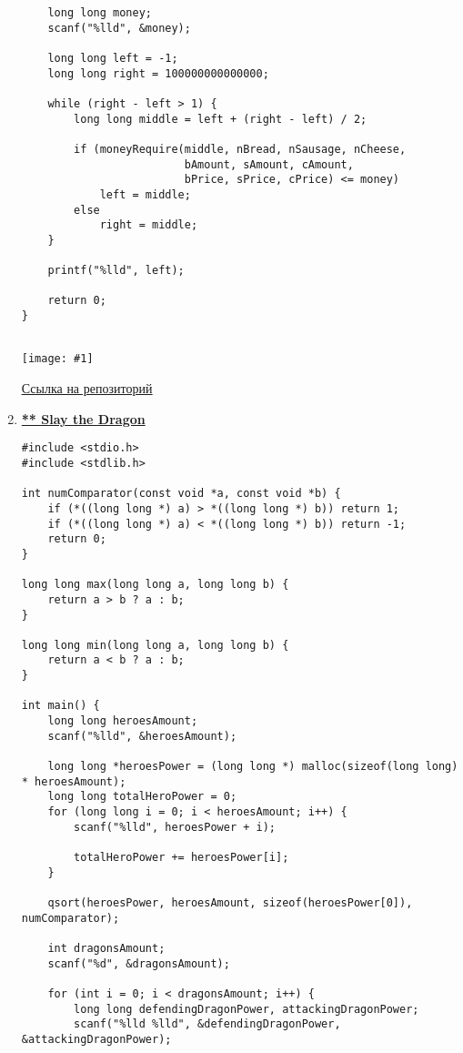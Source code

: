 \documentclass[a4paper,14pt]{extarticle}
\newcommand\codeforcesresult[1]{
    \begin{center}
        \texttt{[image: \#1]}
    \end{center}
}
\begin{document}
\begin{enumerate}
\begin{verbatim}
    long long money;
    scanf("%lld", &money);

    long long left = -1;
    long long right = 100000000000000;

    while (right - left > 1) {
        long long middle = left + (right - left) / 2;

        if (moneyRequire(middle, nBread, nSausage, nCheese,
                         bAmount, sAmount, cAmount,
                         bPrice, sPrice, cPrice) <= money)
            left = middle;
        else
            right = middle;
    }

    printf("%lld", left);

    return 0;
}


\end{verbatim}
\codeforcesresult{/codeforceresults/283932H}
\href{https://github.com/IAmProgrammist/programming-and-algorithmization-basics/blob/c/lab10/17.c}{\underline{Ссылка на репозиторий}}

\newpage
\item \href{https://codeforces.com/problemset/problem/1574/C}{\textbf{** Slay the Dragon}}
\begin{verbatim}
#include <stdio.h>
#include <stdlib.h>

int numComparator(const void *a, const void *b) {
    if (*((long long *) a) > *((long long *) b)) return 1;
    if (*((long long *) a) < *((long long *) b)) return -1;
    return 0;
}

long long max(long long a, long long b) {
    return a > b ? a : b;
}

long long min(long long a, long long b) {
    return a < b ? a : b;
}

int main() {
    long long heroesAmount;
    scanf("%lld", &heroesAmount);

    long long *heroesPower = (long long *) malloc(sizeof(long long) * heroesAmount);
    long long totalHeroPower = 0;
    for (long long i = 0; i < heroesAmount; i++) {
        scanf("%lld", heroesPower + i);

        totalHeroPower += heroesPower[i];
    }

    qsort(heroesPower, heroesAmount, sizeof(heroesPower[0]), numComparator);

    int dragonsAmount;
    scanf("%d", &dragonsAmount);

    for (int i = 0; i < dragonsAmount; i++) {
        long long defendingDragonPower, attackingDragonPower;
        scanf("%lld %lld", &defendingDragonPower, &attackingDragonPower);


\end{verbatim}
\end{enumerate}
\end{document}
